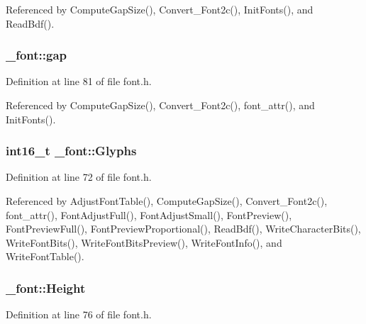 Referenced by Compute\+Gap\+Size(), Convert\+\_\+\+Font2c(), Init\+Fonts(), and Read\+Bdf().

\subsubsection[{\texorpdfstring{gap}{gap}}]{ \+\_\+font\+::gap}\hypertarget{struct__font_af4d840b8e62f6a0548cef0a5474416f4}{}\label{struct__font_af4d840b8e62f6a0548cef0a5474416f4}


Definition at line 81 of file font.\+h.



Referenced by Compute\+Gap\+Size(), Convert\+\_\+\+Font2c(), font\+\_\+attr(), and Init\+Fonts().

\subsubsection[{\texorpdfstring{Glyphs}{Glyphs}}]{\setlength{\rightskip}{0pt plus 5cm}int16\+\_\+t \+\_\+font\+::\+Glyphs}\hypertarget{struct__font_a1e89c06fc11a730eb602522dc8953491}{}\label{struct__font_a1e89c06fc11a730eb602522dc8953491}


Definition at line 72 of file font.\+h.



Referenced by Adjust\+Font\+Table(), Compute\+Gap\+Size(), Convert\+\_\+\+Font2c(), font\+\_\+attr(), Font\+Adjust\+Full(), Font\+Adjust\+Small(), Font\+Preview(), Font\+Preview\+Full(), Font\+Preview\+Proportional(), Read\+Bdf(), Write\+Character\+Bits(), Write\+Font\+Bits(), Write\+Font\+Bits\+Preview(), Write\+Font\+Info(), and Write\+Font\+Table().

\subsubsection[{\texorpdfstring{Height}{Height}}]{ \+\_\+font\+::\+Height}\hypertarget{struct__font_a5888921d1a78bf917351a275e2033467}{}\label{struct__font_a5888921d1a78bf917351a275e2033467}


Definition at line 76 of file font.\+h.



